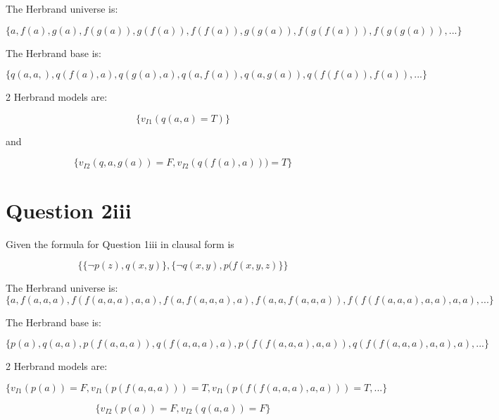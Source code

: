 \documentclass[10pt,a4paper]{article}
\begin{document}
The Herbrand universe is:

\begin{equation}
 \{ a,f(a),g(a),f(g(a)),g(f(a)),f(f(a)),g(g(a)),f(g(f(a))),f(g(g(a))),...     \}
\end{equation}

The Herbrand base is:

\begin{equation}
 \{ q(a,a,),q(f(a),a),q(g(a),a),q(a,f(a)),q(a,g(a)),q(f(f(a)),f(a)),...    \}
\end{equation}

2 Herbrand models are:

\begin{equation}
 \{ v_{I1}(q(a,a) = T)   \}
\end{equation}

and

\begin{equation}
 \{ v_{I2}(q,a,g(a)) = F,v_{I2}(q(f(a),a)) ) = T            \}
\end{equation}


\section{Question 2iii}

Given the formula for Question 1iii in clausal form is

\begin{equation}
 \{\{\neg p(z),q(x,y)\},\{\neg q(x,y),p(f(x,y,z)\}\}
\end{equation}

The Herbrand universe is:
\begin{equation}
 \{ a,f(a,a,a),f(f(a,a,a),a,a),f(a,f(a,a,a),a),f(a,a,f(a,a,a)),f(f(f(a,a,a),a,a),a,a),...   \}
\end{equation}

The Herbrand base is:

\begin{equation}
 \{ p(a),q(a,a),p(f(a,a,a)),q(f(a,a,a),a),p(f(f(a,a,a),a,a)),q(f(f(a,a,a),a,a),a),...   \}
\end{equation}

2 Herbrand models are:

\begin{equation}
 \{ v_{I1}(p(a))=F,v_{I1}(p(f(a,a,a)))= T,v_{I1}(p(f(f(a,a,a),a,a)))= T,...    \}
\end{equation}

\begin{equation}
 \{ v_{I2}(p(a))=F,v_{I2}(q(a,a))= F\}
\end{equation}
\end{document}
